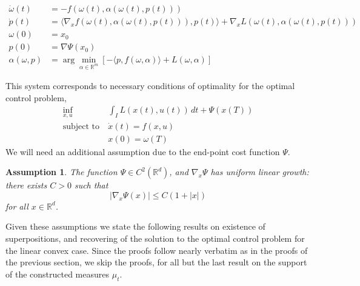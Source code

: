 \documentclass{article}
\newtheorem{assumption}[theorem]{Assumption}
\begin{document}
\begin{align}
\label{eq:pmpve}
\dot{\omega}(t) &= -f(\omega(t), \alpha(\omega(t), p(t))) \\
\dot{p}(t) &= \langle \nabla_x f(\omega(t), \alpha(\omega(t), p(t))), p(t) \rangle + \nabla_x L(\omega(t), \alpha(\omega(t), p(t))) \nonumber \\
\omega(0) &= x_0 \nonumber \\
p(0) &= \nabla \Psi (x_0) \nonumber  \\
\alpha(\omega, p) &= \arg\min_{\alpha \in \mathbb{R}^m} \left[-\langle p, f(\omega, \alpha) \rangle + L(\omega, \alpha)\right] \nonumber
\end{align}

This system corresponds to necessary conditions of optimality for the optimal control problem,
\begin{align}
\label{eq:nonlinear-opt}
\inf_{x,u} & \int_I L(x(t),u(t)) \, dt + \Psi (x(T))  \\
\text{subject to} ~ & \dot{x}(t) = f(x,u) \nonumber \\
& x(0) = \omega(T)  \nonumber
\end{align}
We will need an additional assumption due to the end-point cost function $\Psi$.
\begin{assumption}
\label{asmp:termcost}
The function $\Psi \in C^2(\mathbb{R}^d)$, and $\nabla_x \Psi $ has uniform linear growth: there exists $C > 0$ such that
\[|\nabla_x \Psi(x)| \leq C(1 + |x|)\]
for all $x \in \mathbb{R}^d$.
\end{assumption}

Given these assumptions we state the following results on existence of superpositions, and recovering of the solution to the optimal control problem for the linear convex case. Since the proofs follow nearly verbatim as in the proofs of the previous section, we skip the proofs, for all but the last result on the support of the constructed measures $\mu_t$. 
\end{document}
